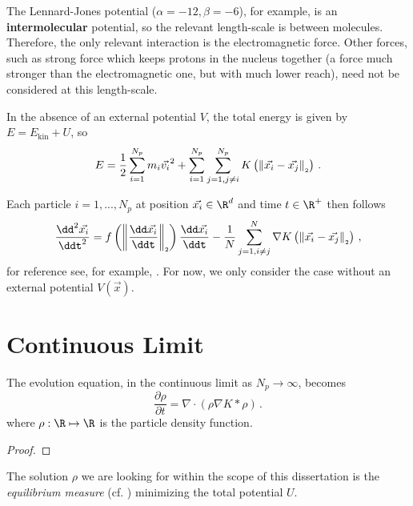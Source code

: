 The Lennard-Jones potential ($\alpha=-12, \beta=-6$), for example, is an \textbf{intermolecular} potential, so the relevant length-scale is between molecules.
Therefore, the only relevant interaction is the electromagnetic force.
Other forces, such as strong force which keeps protons in the nucleus together (a force much stronger than the electromagnetic one, but with much lower reach), need not be considered at this length-scale.

In the absence of an external potential $V$, the total energy is given by $E = E_{\text{kin}} + U$, so
\begin{equation}
  E = \frac{1}{2} \sum_{i=1}^{N_p} m_i \vec{v_i}^2 + \sum_{i=1}^{N_p}\sum_{j=1, j \neq i}^{N_p} K\left(\left\lVert\vec{x_i} - \vec{x_j}\right\rVert_{\scriptscriptstyle 2}\right)\,.
  \label{eq:total-energy}
\end{equation}

Each particle $i=1, ..., N_p$ at position $\vec{x_i} \in \R^d$ and time $t \in \R^+$ then follows
\begin{equation}
  \frac{\dd^2 \vec{x_i}}{\ddt^2} = f\left(\norm{\frac{\dd \vec{x_i}}{\ddt}}\right) \frac{\dd\vec{x_i}}{\ddt} - \frac{1}{N} \sum_{j=1, i\neq j}^{N} \nabla K\left(\norm{\vec{x_i} - \vec{x_j}}\right)\,,
  \label{eq:evolution-equation}
\end{equation}
for reference see, for example, \parencite{2020-power-law-kernels, 2021-arbitrary-dimensions}.
For now, we only consider the case without an external potential $V(\vec{x})$.

\section{Continuous Limit}
The evolution equation, in the continuous limit as $N_p \rightarrow \infty$, becomes
\begin{equation}
  \frac{\partial \rho}{\partial t} = \nabla \cdot \left(\rho \nabla K * \rho\right)\,.
  \label{eq:continuous-evolution-equation}
\end{equation}
where $\rho: \R \mapsto \R$ is the particle density function.
\begin{proof}
  \hierKoennteIhreWerbungStehen
\end{proof}
The solution $\rho$ we are looking for within the scope of this dissertation is the \textit{equilibrium measure} (cf. ) minimizing the total potential $U$.

